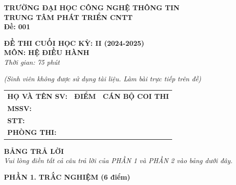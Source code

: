 \documentclass[11pt,a4paper]{article}
\begin{document}
\noindent
\begin{minipage}[t]{0.48\textwidth}
    \centering
    \textbf{TRƯỜNG ĐẠI HỌC CÔNG NGHỆ THÔNG TIN}\\
    \textbf{TRUNG TÂM PHÁT TRIỂN CNTT}\\
    \vspace{0.2cm}
    \textbf{Đề: 001}
\end{minipage}
\hfill
\begin{minipage}[t]{0.48\textwidth}
    \centering
    \textbf{ĐỀ THI CUỐI HỌC KỲ: II (2024-2025)}\\
    \textbf{MÔN: HỆ ĐIỀU HÀNH}\\
    \textit{Thời gian: 75 phút}
\end{minipage}

\vspace{0.3cm}
\begin{center}
    \textit{(Sinh viên không được sử dụng tài liệu. Làm bài trực tiếp trên đề)}
\end{center}

\vspace{0.2cm}

\noindent
\begin{tabularx}{\textwidth}{|X|p{2.2cm}|p{4cm}|}
\hline
\textbf{HỌ VÀ TÊN SV:} \dotfill & \centering\textbf{ĐIỂM} & \centering\textbf{CÁN BỘ COI THI} \tabularnewline
\textbf{MSSV:} \dotfill & & \tabularnewline
\textbf{STT:} \dotfill & & \tabularnewline
\textbf{PHÒNG THI:} \dotfill & & \tabularnewline
\hline
\end{tabularx}

\vspace{0.4cm}

\begin{center}
    \textbf{\large BẢNG TRẢ LỜI}\\
    \textit{Vui lòng điền tất cả câu trả lời của PHẦN 1 và PHẦN 2 vào bảng dưới đây.}
\end{center}

\vspace{0.1cm}
\noindent\textbf{PHẦN 1. TRẮC NGHIỆM (6 điểm)}
\vspace{0.1cm}
\end{document}
